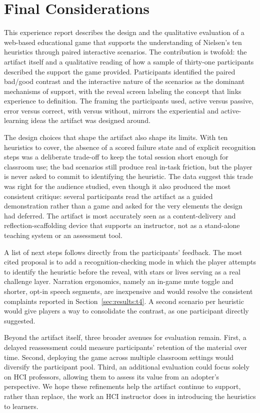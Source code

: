 \section{Final Considerations}
\label{sec:conclusion}

This experience report describes the design and the qualitative evaluation of a web-based educational game that supports the understanding of Nielsen's ten heuristics through paired interactive scenarios. The contribution is twofold: the artifact itself and a qualitative reading of how a sample of thirty-one participants described the support the game provided. Participants identified the paired bad/good contrast and the interactive nature of the scenarios as the dominant mechanisms of support, with the reveal screen labeling the concept that links experience to definition. The framing the participants used, active versus passive, error versus correct, with versus without, mirrors the experiential and active-learning ideas the artifact was designed around.

The design choices that shape the artifact also shape its limits. With ten heuristics to cover, the absence of a scored failure state and of explicit recognition steps was a deliberate trade-off to keep the total session short enough for classroom use; the bad scenarios still produce real in-task friction, but the player is never asked to commit to identifying the heuristic. The data suggest this trade was right for the audience studied, even though it also produced the most consistent critique: several participants read the artifact as a guided demonstration rather than a game and asked for the very elements the design had deferred. The artifact is most accurately seen as a content-delivery and reflection-scaffolding device that supports an instructor, not as a stand-alone teaching system or an assessment tool.

A list of next steps follows directly from the participants' feedback. The most cited proposal is to add a recognition-checking mode in which the player attempts to identify the heuristic before the reveal, with stars or lives serving as a real challenge layer. Narration ergonomics, namely an in-game mute toggle and shorter, opt-in speech segments, are inexpensive and would resolve the consistent complaints reported in Section~\ref{sec:results:t4}. A second scenario per heuristic would give players a way to consolidate the contrast, as one participant directly suggested.

Beyond the artifact itself, three broader avenues for evaluation remain. First, a delayed reassessment could measure participants' retention of the material over time. Second, deploying the game across multiple classroom settings would diversify the participant pool. Third, an additional evaluation could focus solely on HCI professors, allowing them to assess its value from an adopter's perspective. We hope these refinements help the artifact continue to support, rather than replace, the work an HCI instructor does in introducing the heuristics to learners.
